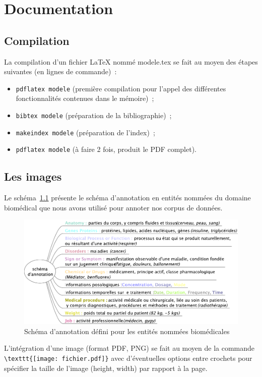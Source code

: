 \chapter{Documentation}

\section{Compilation}
\label{sec:compilation}
La compilation d'un fichier \LaTeX{} nommé \og{}modele.tex\fg{} se fait au moyen des étapes suivantes (en lignes de commande)~:
%
\begin{itemize}
\item \verb+pdflatex modele+ (première compilation pour l'appel des différentes fonctionnalités contenues dans le mémoire)~;
\item \verb+bibtex modele+ (préparation de la bibliographie)~;
\item \verb+makeindex modele+ (préparation de l'index)~;
\item \verb+pdflatex modele+ (à faire 2 fois, produit le PDF complet).
\end{itemize}




\section{Les images}
\label{sec:images}

Le  schéma~\ref{fig:schema} présente le schéma
d'annotation en entités nommées du domaine biomédical que nous avons
utilisé pour annoter nos corpus de données.
%
\begin{figure}[h]
  \centering
  \includegraphics[width=.8\linewidth]{annotation2.pdf}
  \caption{Schéma d'annotation défini pour les entités nommées
    biomédicales}
  \label{fig:schema}
\end{figure}

L'intégration d'une image (format PDF, PNG) se fait au moyen de la
commande \verb+\texttt{[image: fichier.pdf]}+ avec d'éventuelles
options entre crochets pour spécifier la taille de l'image (height,
width) par rapport à la page.


